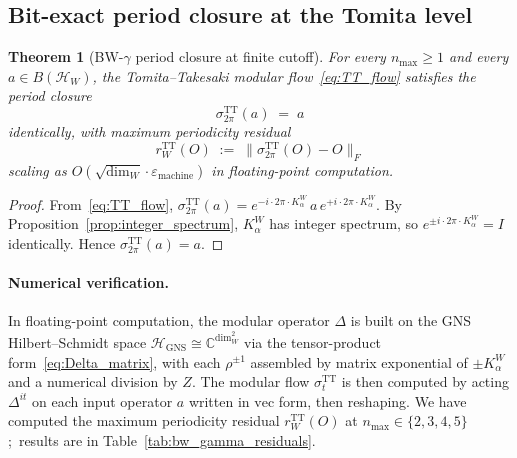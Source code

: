 \documentclass[11pt,a4paper]{article}
\theoremstyle{plain}
\newtheorem{theorem}{Theorem}[section]
\theoremstyle{definition}
\newcommand{\nmax}{n_{\max}}
\newcommand{\Hilb}{\mathcal{H}}
\newcommand{\Frob}[1]{\lVert #1 \rVert_{F}}
\newcommand{\C}{\mathbb{C}}
\newcommand{\TT}{\mathrm{TT}}
\newcommand{\GNS}{\mathrm{GNS}}
\begin{document}
\subsection{Bit-exact period closure at the Tomita level}
\label{sec:tt_period}

\begin{theorem}[BW-$\gamma$ period closure at finite cutoff]
\label{thm:bw_gamma}
For every $\nmax \ge 1$ and every $a \in B(\Hilb_W)$, the
Tomita--Takesaki modular flow~\eqref{eq:TT_flow} satisfies the
period closure
\begin{equation}\label{eq:bw_gamma_closure}
   \sigma_{2\pi}^{\TT}(a) \;=\; a
\end{equation}
identically, with maximum periodicity residual
\begin{equation*}
   r_W^{\TT}(O)
   \;:=\; \Frob{\sigma_{2\pi}^{\TT}(O) - O}
\end{equation*}
scaling as $O(\sqrt{\dim_W} \cdot \varepsilon_{\mathrm{machine}})$ in
floating-point computation.
\end{theorem}

\begin{proof}
From~\eqref{eq:TT_flow}, $\sigma_{2\pi}^{\TT}(a) = e^{-i \cdot 2\pi
\cdot K_\alpha^W}\, a\, e^{+i \cdot 2\pi \cdot K_\alpha^W}$. By
Proposition~\ref{prop:integer_spectrum}, $K_\alpha^W$ has integer
spectrum, so $e^{\pm i \cdot 2\pi \cdot K_\alpha^W} = I$ identically.
Hence $\sigma_{2\pi}^{\TT}(a) = a$.
\end{proof}

\paragraph{Numerical verification.}
In floating-point computation, the modular operator $\Delta$ is built
on the GNS Hilbert--Schmidt space $\Hilb_{\GNS} \cong \C^{\dim_W^2}$
via the tensor-product form~\eqref{eq:Delta_matrix}, with each
$\rho^{\pm 1}$ assembled by matrix exponential of $\pm K_\alpha^W$ and
a numerical division by $Z$. The modular flow $\sigma_t^{\TT}$ is then
computed by acting $\Delta^{it}$ on each input operator $a$ written in
$\mathrm{vec}$ form, then reshaping. We have computed the maximum
periodicity residual $r_W^{\TT}(O)$ at $\nmax \in \{2, 3, 4, 5\}$;\
results are in Table~\ref{tab:bw_gamma_residuals}.
\end{document}
